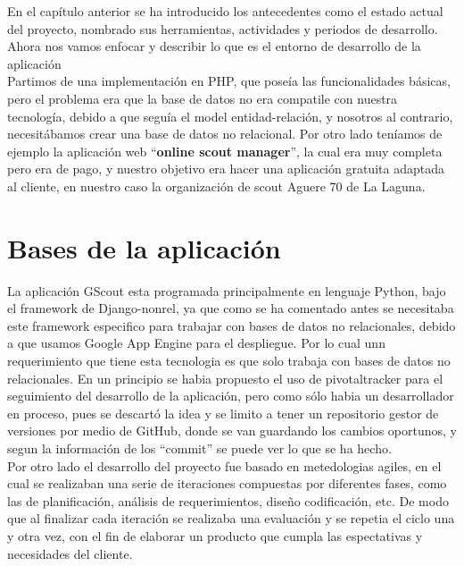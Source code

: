 

En el capítulo anterior se ha introducido los antecedentes como el estado actual del proyecto, 
nombrado sus herramientas, actividades y periodos de desarrollo. Ahora nos vamos enfocar y describir lo que es el
entorno de desarrollo de la aplicación\\

Partimos de una implementación en PHP, que poseía las funcionalidades básicas, pero el problema era que la base de datos
no era compatile con nuestra tecnología, debido a que seguía el model entidad-relación, y nosotros al contrario, necesitábamos
crear una base de datos no relacional. Por otro lado teníamos de ejemplo la aplicación web ``\textbf{online scout manager}'', la cual era muy completa
pero era de pago, y nuestro objetivo era hacer una aplicación gratuita adaptada al cliente, en nuestro caso la organización de scout Aguere 70 de La Laguna.



\section{Bases de la aplicación}
\label{2:sec1}

La aplicación GScout esta programada principalmente en lenguaje Python, bajo el framework de Django-nonrel,  
ya que como se ha comentado antes se necesitaba este framework especifico para trabajar con bases de datos no relacionales,
debido a que usamos Google App Engine para el despliegue. Por lo cual unn requerimiento que tiene esta tecnologia es que solo trabaja con
bases de datos no relacionales. En un principio se habia propuesto el uso de pivotaltracker para el seguimiento del desarrollo de la aplicación, 
pero como sólo habia un desarrollador en proceso, pues se descartó la idea y se limito a tener un repositorio gestor de versiones por medio de
GitHub, donde se van guardando los cambios oportunos, y segun la información de los ``commit'' se puede ver lo que se ha hecho.\\

Por otro lado el desarrollo del proyecto fue basado en metedologias agiles, en el cual se realizaban una serie de iteraciones compuestas por diferentes fases, como 
las de planificación, análisis de requerimientos, diseño codificación, etc. De modo que al finalizar cada iteración se realizaba una evaluación y se repetia el ciclo una y otra vez,
con el fin de elaborar un producto que cumpla las espectativas y necesidades del cliente.\\

